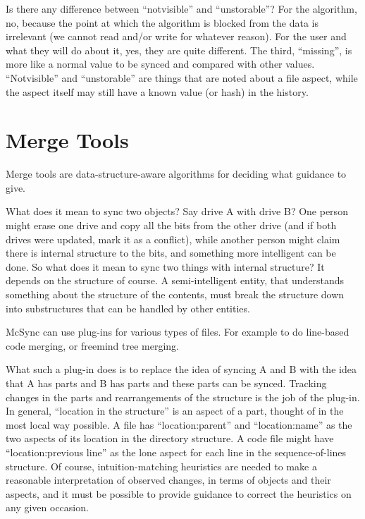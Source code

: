 \documentclass{book}
\begin{document}
Is there any difference between ``notvisible'' and ``unstorable''?  For the algorithm, no, because the point at which the algorithm is blocked from the data is irrelevant (we cannot read and/or write for whatever reason).  For the user and what they will do about it, yes, they are quite different.
The third, ``missing'', is more like a normal value to be synced and compared with other values.
``Notvisible'' and ``unstorable'' are things that are noted about a file aspect, while the aspect itself may still have a known value (or hash) in the history.



\section{Merge Tools}

Merge tools are data-structure-aware algorithms for deciding what guidance to give.

What does it mean to sync two objects?  Say drive A with drive B?  One person might erase one drive and copy all the bits from the other drive (and if both drives were updated, mark it as a conflict), while another person might claim there is internal structure to the bits, and something more intelligent can be done.  So what does it mean to sync two things with internal structure?  It depends on the structure of course.  A semi-intelligent entity, that understands something about the structure of the contents, must break the structure down into substructures that can be handled by other entities.

McSync can use plug-ins for various types of files.  For example to do line-based code merging, or freemind tree merging.

What such a plug-in does is to replace the idea of syncing A and B with the idea that A has parts and B has parts and these parts can be synced.  Tracking changes in the parts and rearrangements of the structure is the job of the plug-in.  In general, ``location in the structure'' is an aspect of a part, thought of in the most local way possible.  A file has ``location:parent'' and ``location:name'' as the two aspects of its location in the directory structure.  A code file might have ``location:previous line'' as the lone aspect for each line in the sequence-of-lines structure.  Of course, intuition-matching heuristics are needed to make a reasonable interpretation of observed changes, in terms of objects and their aspects, and it must be possible to provide guidance to correct the heuristics on any given occasion.
\end{document}

